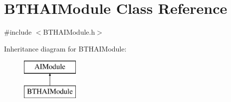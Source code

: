 \hypertarget{class_b_t_h_a_i_module}{\section{B\-T\-H\-A\-I\-Module Class Reference}
\label{class_b_t_h_a_i_module}
}


{\ttfamily \#include $<$B\-T\-H\-A\-I\-Module.\-h$>$}

Inheritance diagram for B\-T\-H\-A\-I\-Module\-:\begin{figure}[H]
\begin{center}
\leavevmode
\includegraphics[height=2.000000cm]{class_b_t_h_a_i_module}
\end{center}
\end{figure}
